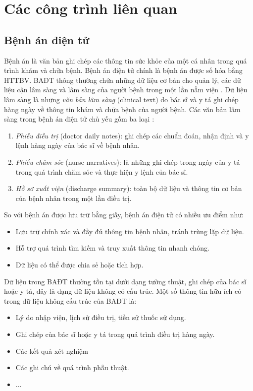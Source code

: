 \chapter{Các công trình liên quan}
\section{Bệnh án điện tử}
Bệnh án là văn bản ghi chép các thông tin sức khỏe của một cá nhân trong quá trình khám và chữa bệnh. Bệnh án điện tử chính là bệnh án được số hóa bằng HTTBV. BAĐT thông thường chứa những dữ liệu cơ bản cho quản lý, các dữ liệu cận lâm sàng và lâm sàng của người bệnh trong một lần nằm viện \cite{HoTuBao2015}. Dữ liệu lâm sàng là những \textit{văn bản lâm sàng} (clinical text) do bác sĩ và y tá ghi chép hàng ngày về thông tin khám và chữa bệnh của người bệnh. Các văn bản lâm sàng trong bệnh án điện tử chủ yếu gồm ba loại \cite{HoTuBao2015}:

\begin{enumerate}[leftmargin=\the\parindent]
\item \emph{Phiếu điều trị} (doctor daily notes): ghi chép các chuẩn đoán, nhận định và y lệnh hàng ngày của bác sĩ về bệnh nhân.
\item \emph{Phiếu chăm sóc} (nurse narratives): là những ghi chép trong ngày của y tá trong quá trình chăm sóc và thực hiện y lệnh của bác sĩ.
\item \emph{Hồ sơ xuất viện} (discharge summary): toàn bộ dữ liệu và thông tin cơ bản của bệnh nhân trong một lần điều trị.
\end{enumerate}

So với bệnh án được lưu trữ bằng giấy, bệnh án điện tử có nhiều ưu điểm như:

\begin{itemize}[noitemsep]
\item Lưu trữ chính xác và đầy đủ thông tin bệnh nhân, tránh trùng lặp dữ liệu.
\item Hỗ trợ quá trình tìm kiếm và truy xuất thông tin nhanh chóng.
\item Dữ liệu có thể được chia sẻ hoặc tích hợp.
\end{itemize}

Dữ liệu trong BAĐT thường tồn tại dưới dạng tường thuật, ghi chép của bác sĩ hoặc y tá, đây là dạng dữ liệu không có cấu trúc. Một số thông tin hữu ích có trong dữ liệu không cấu trúc của BAĐT là:

\begin{itemize}[noitemsep]
\item Lý do nhập viện, lịch sử điều trị, tiền sử thuốc sử dụng.
\item Ghi chép của bác sĩ hoặc y tá trong quá trình điều trị hàng ngày.
\item Các kết quả xét nghiệm
\item Các ghi chú về quá trình phẫu thuật.
\item ...
\end{itemize}

